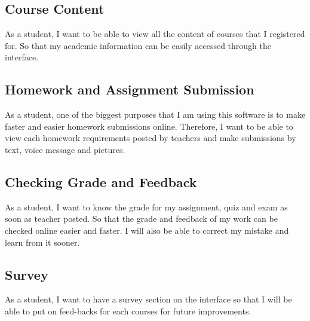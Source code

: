 \subsection{Course Content}
As a student, I want to be able to view all the content of courses that I registered for. So that my academic information can be easily accessed through the interface. 

\subsection{Homework and Assignment Submission}
As a student, one of the biggest purposes that I am using this software is to make faster and easier homework submissions online. Therefore, I want to be able to view each homework requirements posted by teachers and make submissions by text, voice message and pictures. 

\subsection{Checking Grade and Feedback}
As a student, I want to know the grade for my assignment, quiz and exam as soon as teacher posted. So that the grade and feedback of my work can be checked online easier and faster. I will also be able to correct my mistake and learn from it sooner. 

\subsection{Survey}
As a student, I want to have a survey section on the interface so that I will be able to put on feed-backs for each courses for future improvements. 

